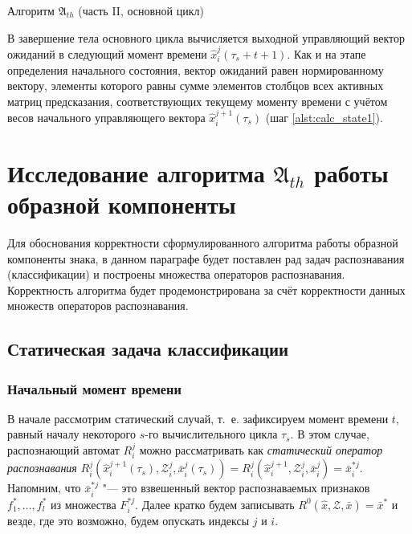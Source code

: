 \begin{algorithm}[H]
	\caption{Алгоритм $\mathfrak{A}_{th}$ (часть II, основной цикл)}\label{alg:th_cycle}
	\begin{algorithmic}[1]
		
	\end{algorithmic}
\end{algorithm}
		
В завершение тела основного цикла вычисляется выходной управляющий вектор ожиданий в следующий момент времени $\hat x_i^j(\tau_s+t+1)$. Как и на этапе определения начального состояния, вектор ожиданий равен нормированному вектору, элементы которого равны сумме элементов столбцов всех активных матриц предсказания, соответствующих текущему моменту времени с учётом весов начального управляющего вектора $\hat x_i^{j+1}(\tau_s)$ (шаг \ref{alst:calc_state1}).

\section{Исследование алгоритма $\mathfrak A_{th}$ работы образной компоненты}\label{sect3_2}

Для обоснования корректности сформулированного алгоритма работы образной компоненты знака, в данном параграфе будет поставлен рад задач распознавания (классификации) и построены множества операторов распознавания. Корректность алгоритма будет продемонстрирована за счёт корректности данных множеств операторов распознавания.

\subsection{Статическая задача классификации}

\subsubsection{Начальный момент времени}
В начале рассмотрим статический случай, т.~е. зафиксируем момент времени $t$, равный началу некоторого $s$-го вычислительного цикла $\tau_s$. В этом случае, распознающий автомат $R_i^j$ можно рассматривать как \textit{статический оператор распознавания} $R_i^j(\hat x_i^{j+1}(\tau_s),\mathcal Z_i^j,\bar x_i^j(\tau_s))=R_i^j(\hat x_i^{j+1},\mathcal Z_i^j,\bar x_i^j)=\bar{x}_i^{*j}$. Напомним, что $\bar{x}_i^{*j}$ "--- это взвешенный вектор распознаваемых признаков $f_1^*,\dots,f_l^*$ из множества $F_i^{*j}$. Далее кратко будем записывать $R^0(\hat{x},\mathcal{Z},\bar{x})=\bar{x}^*$ и везде, где это возможно, будем опускать индексы $j$ и $i$.
	

